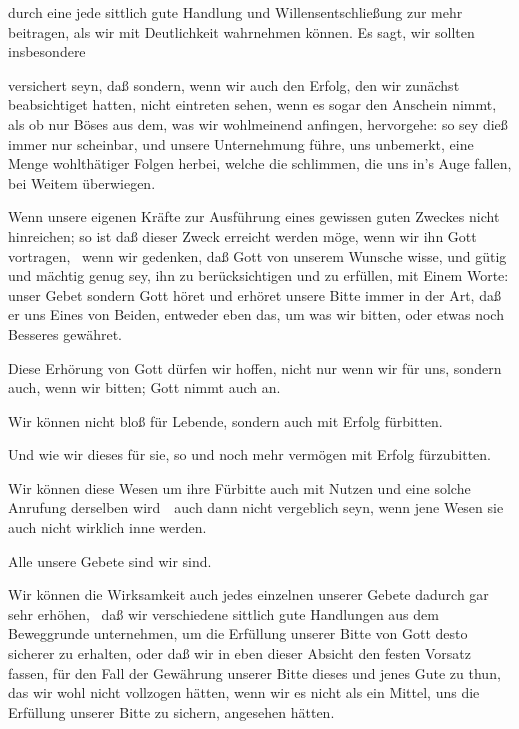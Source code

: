 \begin{aufza}
\item durch eine jede sittlich gute Handlung und Willensentschließung zur  mehr beitragen, als wir mit Deutlichkeit wahrnehmen können. Es sagt, wir sollten insbesondere
\item versichert seyn, daß  sondern, wenn wir auch den Erfolg, den wir zunächst beabsichtiget hatten, nicht eintreten sehen, wenn es sogar den Anschein nimmt, als ob nur Böses aus dem, was wir wohlmeinend anfingen, hervorgehe: so sey dieß immer nur scheinbar, und unsere Unternehmung führe, uns unbemerkt, eine Menge wohlthätiger Folgen herbei, welche die schlimmen, die uns in's Auge fallen, bei Weitem überwiegen.
\item Wenn unsere eigenen Kräfte zur Ausführung eines gewissen guten Zweckes nicht hinreichen; so ist  daß dieser Zweck erreicht werden möge, wenn wir ihn Gott vortragen, \dh\ wenn wir gedenken, daß Gott von unserem Wunsche wisse, und gütig und mächtig genug sey, ihn zu berücksichtigen und zu erfüllen, mit Einem Worte: unser Gebet  sondern Gott höret und erhöret unsere Bitte immer in der Art, daß er uns Eines von Beiden, entweder eben das, um was wir bitten, oder etwas noch Besseres gewähret.
\item Diese Erhörung von Gott dürfen wir hoffen, nicht nur wenn wir für uns, sondern auch, wenn wir  bitten; Gott nimmt auch  an.
\item Wir können nicht bloß für Lebende, sondern auch  mit Erfolg fürbitten.
\item Und wie wir dieses für sie, so und noch mehr vermögen  mit Erfolg fürzubitten.
\item Wir können diese Wesen um ihre Fürbitte auch mit Nutzen  und eine solche Anrufung derselben wird~\ auch dann nicht vergeblich seyn, wenn jene Wesen sie auch nicht wirklich inne werden.
\item Alle unsere Gebete sind  wir sind.
\item Wir können die Wirksamkeit auch jedes einzelnen unserer Gebete dadurch gar sehr erhöhen,  \dh\ daß wir verschiedene sittlich gute Handlungen aus dem Beweggrunde unternehmen, um die Erfüllung unserer Bitte von Gott desto sicherer zu erhalten, oder daß wir in eben dieser Absicht den festen Vorsatz fassen, für den Fall der Gewährung unserer Bitte dieses und jenes Gute zu thun, das wir wohl nicht vollzogen hätten, wenn wir es nicht als ein Mittel, uns die Erfüllung unserer Bitte zu sichern, angesehen hätten.

\end{aufza}
